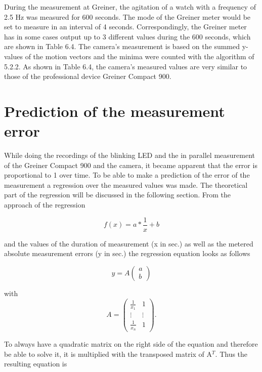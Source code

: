 \documentclass[12pt, a4paper]{report}
\begin{document}
    During the measurement at Greiner, the agitation of a watch with a frequency of 2.5 Hz was measured for 600 seconds. The mode of the Greiner meter would be set to measure in an interval of 4 seconds. Correspondingly, the Greiner meter has in some cases output up to 3 different values during the 600 seconds, which are shown in Table 6.4. The camera's measurement is based on the summed y-values of the motion vectors and the minima were counted with the algorithm of 5.2.2.
    As shown in Table 6.4, the camera's measured values are very similar to those of the professional device Greiner Compact 900.
         
    \chapter{Prediction of the measurement error}
    While doing the recordings of the blinking LED and the in parallel measurement of the Greiner Compact 900 and the camera, it became apparent that the error is proportional to 1 over time. 
    To be able to make a prediction of the error of the measurement a regression over the measured values was made.
    The theoretical part of the regression will be discussed in the following section. 
    \newline
   From the approach of the regression
   
          \begin{displaymath}
      f(x)= a*\frac{1}{x}+ b
     \end{displaymath}
     
     and the values of the duration of measurement (x in sec.) as well as the metered absolute measurement errors (y in sec.) the regression equation looks as follows
     
\begin{equation}
y = A
\begin{pmatrix}
a \\ b \end{pmatrix}
 \end{equation}
 
 with 
 \begin{equation}
A = 
\begin{pmatrix}
\frac{1}{x_1} & 1\\ \vdots & \vdots \\ \frac{1}{x_n} & 1 \end{pmatrix}.
 \end{equation}
 
 To always have a quadratic matrix on the right side of the equation and therefore be able to solve it, it is multiplied with the transposed matrix of A$^T$. Thus the resulting equation is
 
\end{document}
